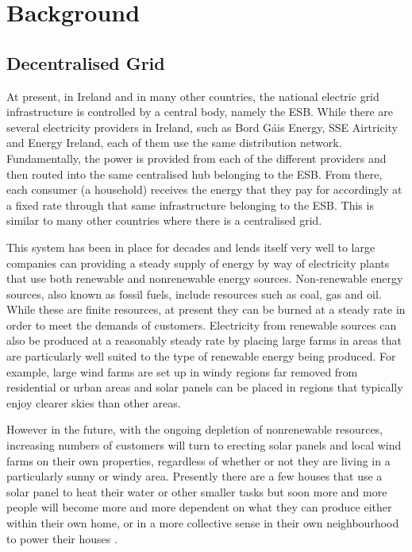 \documentclass[a4paper, notitlepage]{report}
\begin{document}
\part{Background}
\label{sec:orgad168e1}
\chapter{Decentralised Grid}
\label{sec:org12c9842}
At present, in Ireland and in many other countries, the national electric grid
infrastructure is controlled by a central body, namely the ESB. While there are
several electricity providers in Ireland, such as Bord Gáis Energy, SSE
Airtricity and Energy Ireland, each of them use the same distribution network.
Fundamentally, the power is provided from each of the different providers and
then routed into the same centralised hub belonging to the ESB. From there, each
consumer (a household) receives the energy that they pay for accordingly at a
fixed rate through that same infrastructure belonging to the ESB. This is
similar to many other countries where there is a centralised grid.

This system has been in place for decades and lends itself very well to large
companies can providing a steady supply of energy by way of electricity plants
that use both renewable and nonrenewable energy sources. Non-renewable energy
sources, also known as fossil fuels, include resources such as coal, gas and
oil. While these are finite resources, at present they can be burned at a steady
rate in order to meet the demands of customers. Electricity from renewable
sources can also be produced at a reasonably steady rate by placing large farms
in areas that are particularly well suited to the type of renewable energy being
produced. For example, large wind farms are set up in windy regions far removed
from residential or urban areas and solar panels can be placed in regions that
typically enjoy clearer skies than other areas.

However in the future, with the ongoing depletion of nonrenewable resources,
increasing numbers of customers will turn to erecting solar panels and local
wind farms  on their own properties, regardless of whether or not they are
living in a particularly sunny or windy area. Presently there are a few houses
that use a solar panel to heat their water or other smaller tasks but soon more
and more people will become more and more dependent on what they can produce
either within their own home, or in a more collective sense in their own
neighbourhood to power their houses \cite{apergis2010renewable}.
\end{document}
